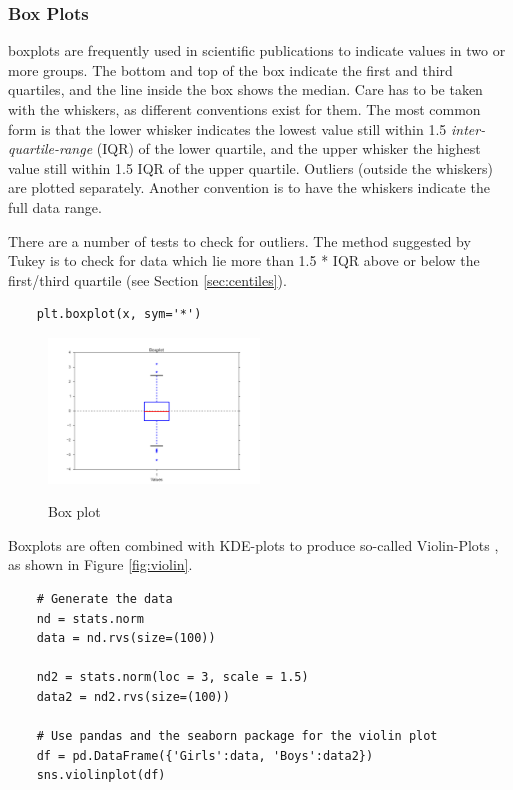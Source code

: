 \subsubsection{Box Plots}

\Glspl{boxplot} are frequently used in scientific publications to indicate values in two or more groups. The bottom and top of the box indicate the first and third \glspl{quartile}, and the line inside the box shows the median. Care has to be taken with the whiskers, as different conventions exist for them. The most common form is that the lower whisker indicates the lowest value still within 1.5 \emph{inter-quartile-range} (IQR) of the lower quartile, and the upper whisker the highest value still within 1.5 IQR of the upper quartile. Outliers (outside the whiskers) are plotted separately. Another convention is to have the whiskers indicate the full data range.

There are a number of tests to check for outliers. The method suggested by Tukey is to check for data which lie more than 1.5 * IQR above or below the first/third quartile (see Section \ref{sec:centiles}).

\begin{lstlisting}
    plt.boxplot(x, sym='*')
\end{lstlisting}

\begin{figure}[H]
  \centering
  \includegraphics[width=0.5\textwidth]{../Images/boxplot.png}\\
  \caption{Box plot}\label{fig:Boxplot}
\end{figure}

Boxplots are often combined with KDE-plots to produce so-called Violin-Plots , as shown in Figure \ref{fig:violin}.

\begin{lstlisting}
    # Generate the data
    nd = stats.norm
    data = nd.rvs(size=(100))

    nd2 = stats.norm(loc = 3, scale = 1.5)
    data2 = nd2.rvs(size=(100))

    # Use pandas and the seaborn package for the violin plot
    df = pd.DataFrame({'Girls':data, 'Boys':data2})
    sns.violinplot(df)
\end{lstlisting}

